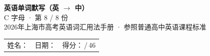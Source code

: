 \documentclass[10pt,a4paper]{article}
\begin{document}
\pagestyle{plain}

\begin{center}
{\LARGE\bfseries 英语单词默写（英 $\to$ 中）}\\[0.22em]
{\large C 字母 · 第 8 / 8 份}\\[0.18em]
{\small 2026年上海市高考英语词汇用法手册 · 参照普通高中英语课程标准}
\end{center}

\vspace{0.25em}
\noindent\begin{tabular}{@{}p{}@{}p{}@{}p{}@{}}
姓名：\underline{\hspace{2.0cm}} & 日期：\underline{\hspace{2.0cm}} & 得分：\underline{\hspace{1.3cm}}\,/\,46 \\
\end{tabular}

\vspace{0.3em}

\vspace{0.08em}
\end{document}
